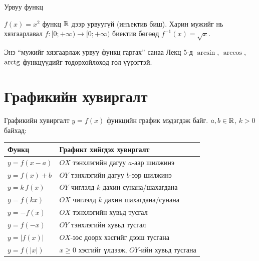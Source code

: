 \begin{frame}[allowframebreaks]{Урвуу функц}
\begin{example}
$f(x)=x^2$ функц $\mathbb{R}$ дээр урвуугүй (инъектив биш). Харин мужийг нь хязгаарлавал
$f:[0;+\infty)\to[0;+\infty)$ биектив бөгөөд $f^{-1}(x)=\sqrt{x}$.
\begin{center}
\begin{fitbox}\end{fitbox}
\end{center}
Энэ ``мужийг хязгаарлаж урвуу функц гаргах'' санаа Лекц 5-д $\arcsin$, $\arccos$,
$\operatorname{arctg}$ функцүүдийг тодорхойлоход гол үүрэгтэй.
\end{example}
\end{frame}

\section{Графикийн хувиргалт}
\begin{frame}[allowframebreaks]{Графикийн хувиргалт}
$y=f(x)$ функцийн график мэдэгдэж байг. $a,b\in\mathbb{R}$, $k>0$ байхад:
\begin{center}
\renewcommand{\arraystretch}{1.35}
\begin{fitbox}\begin{tabular}{l|l}
Функц & Графикт хийгдэх хувиргалт \\\hline
$y=f(x-a)$ & $OX$ тэнхлэгийн дагуу $a$-аар шилжинэ \\
$y=f(x)+b$ & $OY$ тэнхлэгийн дагуу $b$-ээр шилжинэ \\
$y=k\,f(x)$ & $OY$ чиглэлд $k$ дахин сунана/шахагдана \\
$y=f(kx)$ & $OX$ чиглэлд $k$ дахин шахагдана/сунана \\
$y=-f(x)$ & $OX$ тэнхлэгийн хувьд тусгал \\
$y=f(-x)$ & $OY$ тэнхлэгийн хувьд тусгал \\
$y=|f(x)|$ & $OX$-ээс доорх хэсгийг дээш тусгана \\
$y=f(|x|)$ & $x\ge0$ хэсгийг үлдээж, $OY$-ийн хувьд тусгана
\end{tabular}\end{fitbox}
\end{center}
\end{frame}

